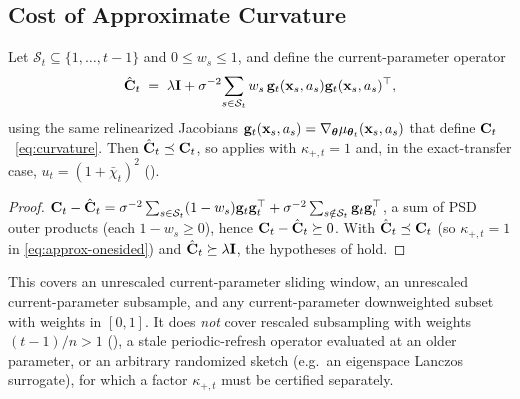 \documentclass[twoside]{article}
\begin{document}
\subsection{Cost of Approximate Curvature}

\begin{proposition}\label{prop:window}
Let $\mathcal{S}_t\subseteq\{1,\dots,t{-}1\}$ and $0\le w_s\le1$, and define the
current-parameter operator
\[
  \hat{\mathbf{C}}_t
  \;=\;
  \lambda\mathbf{I}
  +\sigma^{-2}\!\sum_{s\in\mathcal{S}_t} w_s\,
  \mathbf{g}_t(\mathbf{x}_s,a_s)\mathbf{g}_t(\mathbf{x}_s,a_s)^\top ,
\]
using the same relinearized Jacobians $\mathbf{g}_t(\mathbf{x}_s,a_s)=\nabla_{\boldsymbol{\theta}}
\mu_{\boldsymbol{\theta}_t}(\mathbf{x}_s,a_s)$ that define $\mathbf{C}_t$~\eqref{eq:curvature}.  Then
$\hat{\mathbf{C}}_t\preceq\mathbf{C}_t$, so  applies with
$\kappa_{+,t}=1$ and, in the exact-transfer case, $u_t=(1+\bar\chi_t)^2$
().
\end{proposition}
\begin{proof}
$\mathbf{C}_t-\hat{\mathbf{C}}_t=\sigma^{-2}\sum_{s\in\mathcal{S}_t}(1-w_s)\mathbf{g}_t\mathbf{g}_t^\top
+\sigma^{-2}\sum_{s\notin\mathcal{S}_t}\mathbf{g}_t\mathbf{g}_t^\top$, a sum of PSD outer
products (each $1-w_s\ge0$), hence $\mathbf{C}_t-\hat{\mathbf{C}}_t\succeq0$.  With
$\hat{\mathbf{C}}_t\preceq\mathbf{C}_t$ (so $\kappa_{+,t}=1$ in
\eqref{eq:approx-onesided}) and $\hat{\mathbf{C}}_t\succeq\lambda\mathbf{I}$, the hypotheses of
 hold.
\end{proof}

\noindent
This covers an unrescaled current-parameter sliding window, an unrescaled
current-parameter subsample, and any current-parameter downweighted subset with
weights in $[0,1]$.  It does \emph{not} cover rescaled subsampling with weights
$(t{-}1)/n>1$ (), a stale periodic-refresh operator evaluated
at an older parameter, or an arbitrary randomized sketch (e.g.\ an eigenspace
Lanczos surrogate), for which a factor
$\kappa_{+,t}$ must be certified separately.
\end{document}
